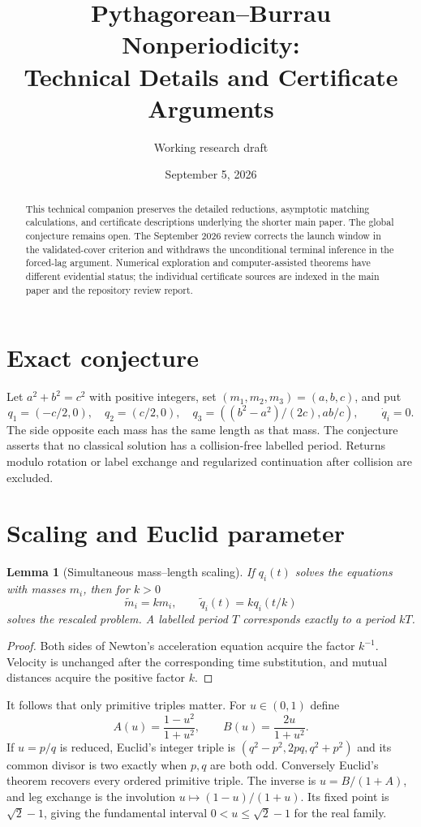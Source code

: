 \documentclass[11pt]{article}
\title{Pythagorean--Burrau Nonperiodicity:\\
Technical Details and Certificate Arguments}
\author{Working research draft}
\date{September 5, 2026}
\newtheorem{lemma}[theorem]{Lemma}
\begin{document}
\maketitle

\begin{abstract}
This technical companion preserves the detailed reductions, asymptotic
matching calculations, and certificate descriptions underlying the shorter
main paper. The global conjecture remains open. The September 2026 review
corrects the launch window in the validated-cover criterion and withdraws
the unconditional terminal inference in the forced-lag argument. Numerical
exploration and computer-assisted theorems have different evidential status;
the individual certificate sources are indexed in the main paper and the
repository review report.
\end{abstract}
\tableofcontents
\clearpage

\section{Exact conjecture}

Let $a^2+b^2=c^2$ with positive integers, set
$(m_1,m_2,m_3)=(a,b,c)$, and put
\[
q_1=(-c/2,0),\quad q_2=(c/2,0),\quad
q_3=((b^2-a^2)/(2c),ab/c),\qquad \dot q_i=0.
\]
The side opposite each mass has the same length as that mass.  The conjecture
asserts that no classical solution has a collision-free labelled period.
Returns modulo rotation or label exchange and regularized continuation after
collision are excluded.

\section{Scaling and Euclid parameter}

\begin{lemma}[Simultaneous mass--length scaling]
If $q_i(t)$ solves the equations with masses $m_i$, then for $k>0$
\[
\widetilde m_i=km_i,\qquad \widetilde q_i(t)=kq_i(t/k)
\]
solves the rescaled problem.  A labelled period $T$ corresponds exactly to a
period $kT$.
\end{lemma}
\begin{proof}
Both sides of Newton's acceleration equation acquire the factor $k^{-1}$.
Velocity is unchanged after the corresponding time substitution, and mutual
distances acquire the positive factor $k$.
\end{proof}

It follows that only primitive triples matter.  For $u\in(0,1)$ define
\[
A(u)=\frac{1-u^2}{1+u^2},\qquad
B(u)=\frac{2u}{1+u^2}.
\]
If $u=p/q$ is reduced, Euclid's integer triple is
$(q^2-p^2,2pq,q^2+p^2)$ and its common divisor is two exactly when $p,q$ are
both odd.  Conversely Euclid's theorem recovers every ordered primitive
triple.  The inverse is $u=B/(1+A)$, and leg exchange is the involution
$u\mapsto(1-u)/(1+u)$.  Its fixed point is $\sqrt2-1$, giving the fundamental
interval $0<u\leq\sqrt2-1$ for the real family.
\end{document}
